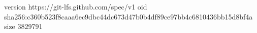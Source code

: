 version https://git-lfs.github.com/spec/v1
oid sha256:c360b523f8caaa6ec9dbc44dc673d47b0b4df89ce97bb4c6810436bb15d8bf4a
size 3829791
